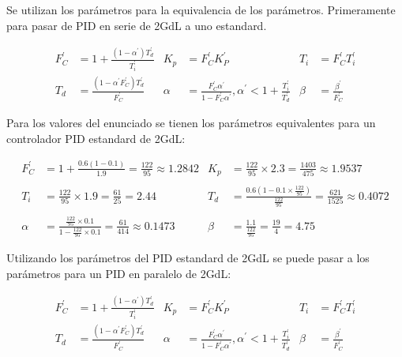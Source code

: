 \begin{ejercicio}
  Se utilizan los parámetros para la equivalencia de los parámetros. Primeramente para pasar de PID en serie de 2GdL a uno estandard.

  \begin{align*}
    F_C^{'} &= 1 + \frac{(1-\alpha^{'})T_d^{'}}{T_i^{'}}
    &
    K_p &= F_C^{'} K_P^{'} 
    &
    T_i &= F_C^{'} T_i^{'}
    \\
    T_d &= \frac{(1-\alpha^{'} F_C^{'}) T_d^{'}}{F_C^{'}}
    &
    \alpha &= \frac{F_C^{'}  \alpha^{'}}{1-F_C^{'}  \alpha^{'}}, \alpha^{'} <1+\frac{T_i^{'}}{T_d^{'}}
    &
    \beta &= \frac{\beta^{'}}{F_C^{'}}
  \end{align*}

Para los valores del enunciado se tienen los parámetros equivalentes para un controlador PID estandard de 2GdL:

  \begin{align*}
    F_C^{'} &= 1 + \frac{0.6(1-0.1)}{1.9} = \frac{122}{95} \approx 1.2842
    &
    K_p &= \frac{122}{95}\times 2.3 = \frac{1403}{475} \approx 1.9537
    \\\\
    T_i &= \frac{122}{95}\times 1.9 = \frac{61}{25} = 2.44
    &
    T_d &= \frac{0.6(1-0.1 \times \frac{122}{95})}{\frac{122}{95}} = \frac{621}{1525} \approx 0.4072
    \\\\
    \alpha &= \frac{\frac{122}{95} \times 0.1}{1-\frac{122}{95} \times 0.1} = \frac{61}{414} \approx 0.1473
    &
    \beta &= \frac{1.1}{\frac{122}{95}} = \frac{19}{4} = 4.75
  \end{align*}

Utilizando los parámetros del PID estandard de 2GdL se puede pasar a los parámetros para un PID en paralelo de 2GdL:

  \begin{align*}
    F_C^{'} &= 1 + \frac{(1-\alpha^{'})T_d^{'}}{T_i^{'}}
    &
    K_p &= F_C^{'} K_P^{'} 
    &
    T_i &= F_C^{'} T_i^{'}
    \\
    T_d &= \frac{(1-\alpha^{'} F_C^{'}) T_d^{'}}{F_C^{'}}
    &
    \alpha &= \frac{F_C^{'}  \alpha^{'}}{1-F_C^{'}  \alpha^{'}}, \alpha^{'} <1+\frac{T_i^{'}}{T_d^{'}}
    &
    \beta &= \frac{\beta^{'}}{F_C^{'}}
  \end{align*}

\end{ejercicio}